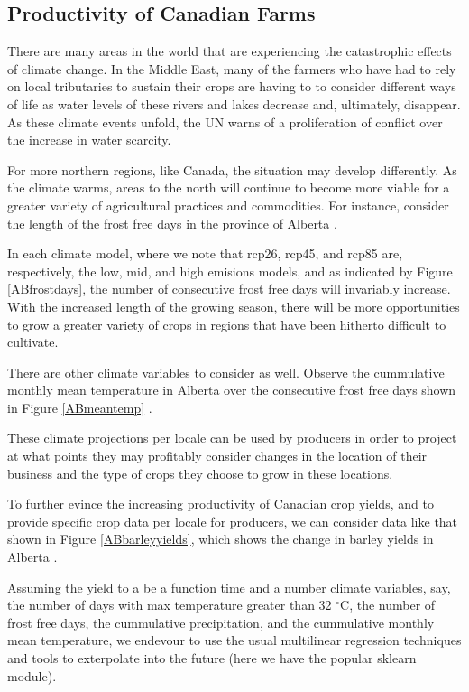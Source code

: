 \documentclass[11pt]{article}
\numberwithin{equation}{section}
\begin{document}
\subsection{Productivity of Canadian Farms}\label{productivity}

There are many areas in the world that are experiencing the catastrophic effects of climate change. In the Middle East, many of the farmers who have had to rely on local tributaries to sustain their crops are having to to consider different ways of life as water levels of these rivers and lakes decrease and, ultimately, disappear. As these climate events unfold, the UN \cite{UN} warns of a proliferation of conflict over the increase in water scarcity.

For more northern regions, like Canada, the situation may develop differently. As the climate warms, areas to the north will continue to become more viable for a greater variety of agricultural practices and commodities. For instance, consider the length of the frost free days in the province of Alberta \cite{climate-data}.

In each climate model, where we note that rcp26, rcp45, and rcp85 are, respectively, the low, mid, and high emisions models, and as indicated by Figure \ref{ABfrostdays}, the number of consecutive frost free days will invariably increase. With the increased length of the growing season, there will be more opportunities to grow a greater variety of crops in regions that have been hitherto difficult to cultivate.

There are other climate variables to consider as well. Observe the cummulative monthly mean temperature in Alberta over the consecutive frost free days shown in Figure \ref{ABmeantemp} \cite{climate-data}.

These climate projections per locale can be used by producers in order to project at what points they may profitably consider changes in the location of their business and the type of crops they choose to grow in these locations.

To further evince the increasing productivity of Canadian crop yields, and to provide specific crop data per locale for producers, we can consider data like that shown in Figure \ref{ABbarleyyields}, which shows the change in barley yields in Alberta \cite{stat-can}. 

Assuming the yield to a be a function time and a number climate variables, say, the number of days with max temperature greater than 32 $^\circ$C, the number of frost free days, the cummulative precipitation, and the cummulative monthly mean temperature, we endevour to use the usual multilinear regression techniques and tools to exterpolate into the future (here we have the popular sklearn module).
\end{document}
